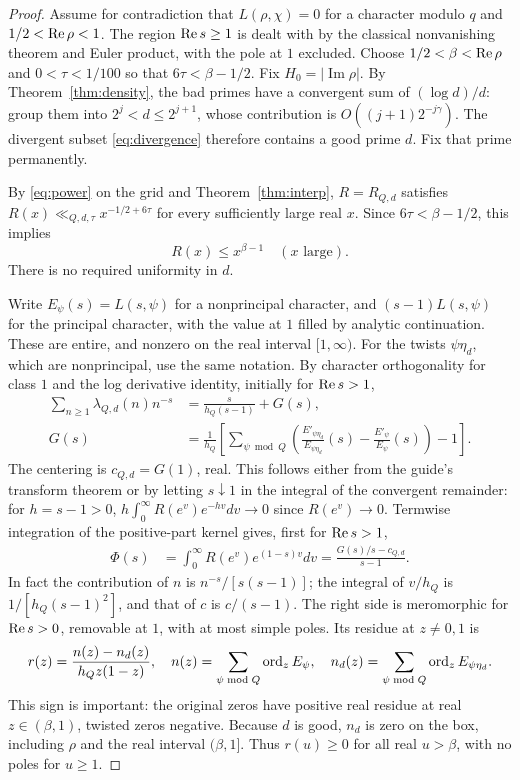 \documentclass[11pt,a4paper]{article}
\theoremstyle{remark}\newtheorem{remark}[theorem]{Remark}
\newcommand{\Ima}{\operatorname{Im}}\newcommand{\E}{\mathcal E}\newcommand{\pos}[1]{\left(#1\right)_+}
\begin{document}
\begin{proof}
Assume for contradiction that $L(\rho,\chi)=0$ for a character modulo $q$ and $1/2<\operatorname{Re}\rho<1$. The region $\operatorname{Re} s\ge1$ is dealt with by the classical nonvanishing theorem and Euler product, with the pole at $1$ excluded. Choose $1/2<\beta<\operatorname{Re}\rho$ and $0<\tau<1/100$ so that $6\tau<\beta-1/2$. Fix $H_0=|\Ima\rho|$. By Theorem~\ref{thm:density}, the bad primes have a convergent sum of $(\log d)/d$: group them into $2^j<d\le2^{j+1}$, whose contribution is $O((j+1)2^{-j\gamma})$. The divergent subset \eqref{eq:divergence} therefore contains a good prime $d$. Fix that prime permanently.

By \eqref{eq:power} on the grid and Theorem~\ref{thm:interp}, $R=R_{Q,d}$ satisfies $R(x)\ll_{Q,d,\tau} x^{-1/2+6\tau}$ for every sufficiently large real $x$. Since $6\tau<\beta-1/2$, this implies
\begin{equation}\label{eq:beta}R(x)\le x^{\beta-1}\quad(x\text{ large}).\end{equation}
There is no required uniformity in $d$.

Write $E_\psi(s)=L(s,\psi)$ for a nonprincipal character, and $(s-1)L(s,\psi)$ for the principal character, with the value at $1$ filled by analytic continuation. These are entire, and nonzero on the real interval $[1,\infty)$. For the twists $\psi\eta_d$, which are nonprincipal, use the same notation. By character orthogonality for class $1$ and the log derivative identity, initially for $\operatorname{Re} s>1$,
\begin{align*}
\sum_{n\ge1}\lambda_{Q,d}(n)n^{-s}&=\frac{s}{h_Q(s-1)}+G(s),\\
G(s)&=\frac1{h_Q}\left[\sum_{\psi\bmod Q}\left(\frac{E'_{\psi\eta_d}}{E_{\psi\eta_d}}(s)-\frac{E'_\psi}{E_\psi}(s)\right)-1\right].
\end{align*}
The centering is $c_{Q,d}=G(1)$, real. This follows either from the guide's transform theorem or by letting $s\downarrow1$ in the integral of the convergent remainder: for $h=s-1>0$, $h\int_0^\infty R(e^v)e^{-hv}dv\to0$ since $R(e^v)\to0$. Termwise integration of the positive-part kernel gives, first for $\operatorname{Re} s>1$,
\begin{align*}
\Phi(s)&=\int_0^\infty R(e^v)e^{(1-s)v}dv
=\frac{G(s)/s-c_{Q,d}}{s-1}.
\end{align*}
In fact the contribution of $n$ is $n^{-s}/[s(s-1)]$; the integral of $v/h_Q$ is $1/[h_Q(s-1)^2]$, and that of $c$ is $c/(s-1)$. The right side is meromorphic for $\operatorname{Re} s>0$, removable at $1$, with at most simple poles. Its residue at $z\ne0,1$ is
\begin{equation}\label{eq:residue}
r(z)=\frac{n(z)-n_d(z)}{h_Q z(1-z)},\quad
n(z)=\sum_{\psi\bmod Q}\operatorname{ord}_z E_\psi,\quad
n_d(z)=\sum_{\psi\bmod Q}\operatorname{ord}_z E_{\psi\eta_d}.
\end{equation}
This sign is important: the original zeros have positive real residue at real $z\in(\beta,1)$, twisted zeros negative. Because $d$ is good, $n_d$ is zero on the box, including $\rho$ and the real interval $(\beta,1]$. Thus $r(u)\ge0$ for all real $u>\beta$, with no poles for $u\ge1$.


\end{proof}
\end{document}
